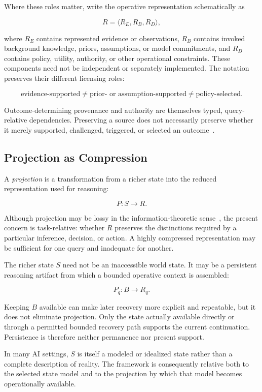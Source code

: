 \documentclass[11pt]{article}
\theoremstyle{definition}
\theoremstyle{remark}
\begin{document}
Where these roles matter, write the operative representation schematically as

\[
R=\langle R_E,R_B,R_D\rangle,
\]

where \(R_E\) contains represented evidence or observations, \(R_B\) contains invoked background knowledge, priors, assumptions, or model commitments, and \(R_D\) contains policy, utility, authority, or other operational constraints. These components need not be independent or separately implemented. The notation preserves their different licensing roles:

\[
\boxed{
\text{evidence-supported}
\neq
\text{prior- or assumption-supported}
\neq
\text{policy-selected}.
}
\]

Outcome-determining provenance and authority are themselves typed, query-relative dependencies. Preserving a source does not necessarily preserve whether it merely supported, challenged, triggered, or selected an outcome~\cite{Hellerstein2026Determination}.

\subsection{Projection as Compression}

A \emph{projection} is a transformation from a richer state into the reduced representation used for reasoning:

\[
P:S\rightarrow R.
\]

Although projection may be lossy in the information-theoretic sense~\cite{Shannon1948}, the present concern is task-relative: whether \(R\) preserves the distinctions required by a particular inference, decision, or action. A highly compressed representation may be sufficient for one query and inadequate for another.

The richer state \(S\) need not be an inaccessible world state. It may be a persistent reasoning artifact from which a bounded operative context is assembled:

\[
P_q:B\rightarrow R_q.
\]

Keeping \(B\) available can make later recovery more explicit and repeatable, but it does not eliminate projection. Only the state actually available directly or through a permitted bounded recovery path supports the current continuation. Persistence is therefore neither permanence nor present support.

In many AI settings, \(S\) is itself a modeled or idealized state rather than a complete description of reality. The framework is consequently relative both to the selected state model and to the projection by which
that model becomes operationally available.
\end{document}
